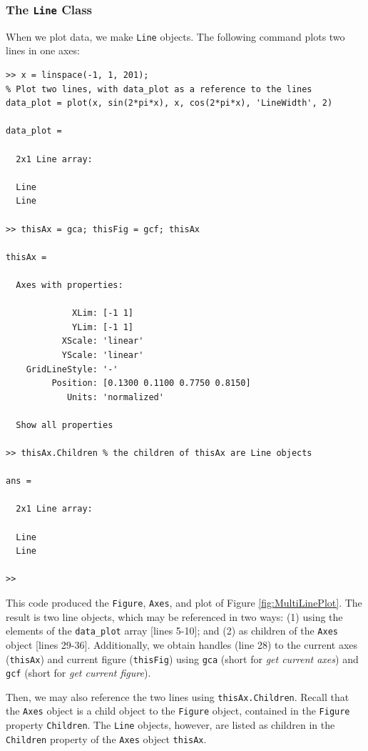  
\subsubsection{The \texttt{Line} Class}

When we plot data, we make \texttt{Line} objects. The following command plots two lines in one axes:
\begin{lstlisting}[style=Matlab-editor, caption={Two data sets are plotted on one \texttt{Axes} object.}]
>> x = linspace(-1, 1, 201);
% Plot two lines, with data_plot as a reference to the lines
data_plot = plot(x, sin(2*pi*x), x, cos(2*pi*x), 'LineWidth', 2)

data_plot = 

  2x1 Line array:

  Line
  Line

>> thisAx = gca; thisFig = gcf; thisAx

thisAx = 

  Axes with properties:

             XLim: [-1 1]
             YLim: [-1 1]
           XScale: 'linear'
           YScale: 'linear'
    GridLineStyle: '-'
         Position: [0.1300 0.1100 0.7750 0.8150]
            Units: 'normalized'

  Show all properties

>> thisAx.Children % the children of thisAx are Line objects

ans = 

  2x1 Line array:

  Line
  Line

>> 
\end{lstlisting}
This code produced the \texttt{Figure}, \texttt{Axes}, and plot of Figure \ref{fig:MultiLinePlot}. The result is two line objects, which may be referenced in two ways: (1) using the elements of the \texttt{data\_plot} array [lines 5-10]; and (2) as children of the \texttt{Axes} object [lines 29-36]. Additionally, we obtain handles (line 28) to the current axes (\texttt{thisAx}) and current figure (\texttt{thisFig}) using \texttt{gca} (short for \textit{get current axes}) and \texttt{gcf} (short for \textit{get current figure}).

Then, we may also reference the two lines using \texttt{thisAx.Children}. Recall that the \texttt{Axes} object is a child object to the \texttt{Figure} object, contained in the \texttt{Figure} property \texttt{Children}. The \texttt{Line} objects, however, are listed as children in the \texttt{Children} property of the \texttt{Axes} object \texttt{thisAx}.

